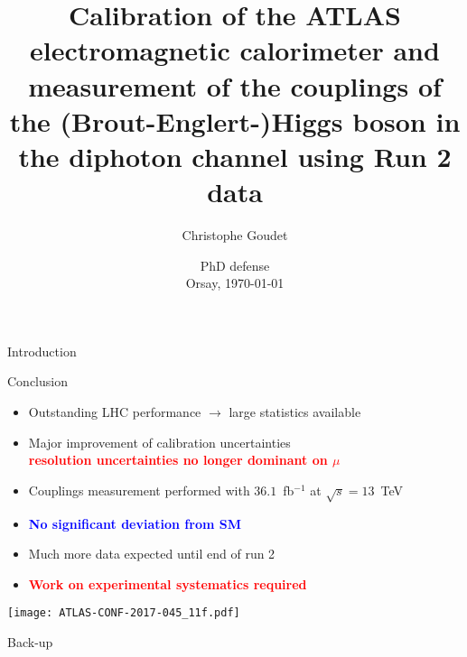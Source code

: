 \documentclass[a4paper]{beamer}
\title[Energy calibration \& Higgs couplings]{Calibration of the ATLAS electromagnetic calorimeter and measurement of the couplings of the (Brout-Englert-)Higgs boson in the diphoton channel using Run 2 data}
\author[Christophe Goudet]{Christophe Goudet}
\institute[LAL]{\texttt{[image: LAL.jpg]} }
\date[Orsay, \today]{PhD defense \\ Orsay, \today}
\begin{document}
\transboxin
\begin{frame}
\maketitle
\end{frame}

\begin{frame}{Introduction}
\tableofcontents
\end{frame}





\begin{frame}{Conclusion}

  \begin{itemize}
  \item Outstanding LHC performance $\rightarrow$ large statistics available
  \item Major improvement of calibration uncertainties \\
    \textcolor{red}{\bf resolution uncertainties no longer dominant on $\mu$}
  \item Couplings measurement performed with $36.1$~fb$^{-1}$ at $\sqrt{s}=13$~TeV
  \item \textcolor{blue}{\bf No significant deviation from SM}
    \end{itemize}

  \begin{minipage}{0.39\linewidth}
    \begin{itemize}
    \item Much more data expected until end of run 2
    \item \textcolor{red}{\bf Work on experimental systematics required}
    \end{itemize}
  \end{minipage}
  \begin{minipage}{0.6\linewidth}
    \texttt{[image: ATLAS-CONF-2017-045\_11f.pdf]}
  \end{minipage}
\end{frame}

\appendix
\begin{frame}{Back-up}
\tableofcontents
\end{frame}





\end{document}
